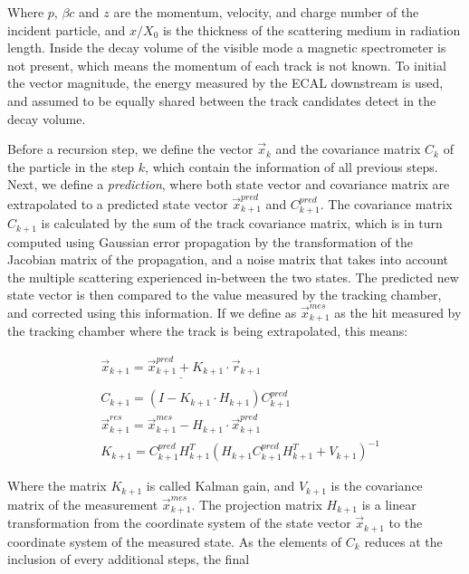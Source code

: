 Where $p$, $\beta c$ and $z$ are the momentum, velocity, and charge number of the incident particle, and $x/X_0$ is the thickness of the scattering medium in radiation length. Inside the decay volume of the visible mode a magnetic spectrometer is not present, which means the momentum of each track is not known. To initial the vector magnitude, the energy measured by the ECAL downstream is used, and assumed to be equally shared between the track candidates detect in the decay volume.

Before a recursion step, we define the vector $\vec{x}_k$ and the covariance matrix $C_k$ of the particle in the step $k$, which contain the information of all previous steps. Next, we define a \textit{prediction}, where both state vector and covariance matrix are extrapolated to a predicted state vector $\vec{x}_{k+1}^{pred}$ and $C_{k+1}^{pred}$. The covariance matrix $C_{k+1}$ is calculated by the sum of the track covariance matrix, which is in turn computed using Gaussian error propagation by the transformation of the Jacobian matrix of the propagation, and a noise matrix that takes into account the multiple scattering experienced in-between the two states. The predicted new state vector is then compared to the value measured by the tracking chamber, and corrected using this information. If we define as $\vec{x}_{k+1}^{mes}$ as the hit measured by the tracking chamber where the track is being extrapolated, this means:

\begin{equation}
  \label{eq:kf-updates}
  \begin{aligned}  
    &\underline{\vec{x}_{k+1} = \vec{x}_{k+1}^{pred} + K_{k+1} \cdot \vec{r}_{k+1}} \\
    & \\
    &C_{k+1} = ( I - K_{k+1} \cdot H_{k+1} )C^{pred}_{k+1} \\
    &\vec{x}^{res}_{k+1} = \vec{x}_{k+1}^{mes} - H_{k+1} \cdot \vec{x}_{k+1}^{pred} \\
    &K_{k+1} = C^{pred}_{k+1} H^T_{k+1}(H_{k+1}C_{k+1}^{pred}H^T_{k+1} + V_{k+1})^{-1}    
  \end{aligned}
\end{equation}

Where the matrix $K_{k+1}$ is called Kalman gain, and $V_{k+1}$ is the covariance matrix of the measurement $\vec{x}_{k+1}^{mes}$. The projection matrix $H_{k+1}$ is a linear transformation from the coordinate system of the state vector $\vec{x}_{k+1}$ to the coordinate system of the measured state. As the elements of $C_k$ reduces at the inclusion of every additional steps, the final 






